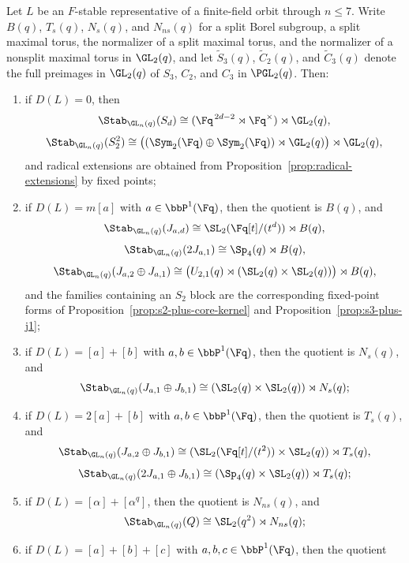\begin{theorem}
\label{thm:finite-field-stabilizers}
Let \(L\) be an \(F\)-stable representative of a finite-field orbit through
\(n\leq 7\). Write \(B(q)\), \(T_s(q)\), \(N_s(q)\), and \(N_{ns}(q)\) for a
split Borel subgroup, a split maximal torus, the normalizer of a split maximal
torus, and the normalizer of a nonsplit maximal torus in \(\GL_2(q)\), and let
\(\widetilde{S}_3(q)\), \(\widetilde{C}_2(q)\), and \(\widetilde{C}_3(q)\)
denote the full preimages in \(\GL_2(q)\) of \(S_3\), \(C_2\), and \(C_3\) in
\(\PGL_2(q)\). Then:
\begin{enumerate}[label=\arabic*.]
\item if \(D(L)=0\), then
  \[
    \Stab_{\GL_n(q)}(S_d)
    \cong
    (\Fq^{\,2d-2}\rtimes \Fq^\times)\rtimes \GL_2(q),
  \]
  \[
    \Stab_{\GL_n(q)}(S_2^2)
    \cong
    \bigl((\Sym_2(\Fq)\oplus \Sym_2(\Fq))\rtimes \GL_2(q)\bigr)\rtimes \GL_2(q),
  \]
  and radical extensions are obtained from
  Proposition~\ref{prop:radical-extensions} by fixed points;
\item if \(D(L)=m[a]\) with \(a\in \bbP^1(\Fq)\), then the quotient is
  \(B(q)\), and
  \[
    \Stab_{\GL_n(q)}(J_{a,d})
    \cong
    \SL_2(\Fq[t]/(t^d))\rtimes B(q),
  \]
  \[
    \Stab_{\GL_n(q)}(2J_{a,1})
    \cong
    \Sp_4(q)\rtimes B(q),
  \]
  \[
    \Stab_{\GL_n(q)}(J_{a,2}\oplus J_{a,1})
    \cong
    \bigl(U_{2,1}(q)\rtimes (\SL_2(q)\times \SL_2(q))\bigr)\rtimes B(q),
  \]
  and the families containing an \(S_2\) block are the corresponding
  fixed-point forms of Proposition~\ref{prop:s2-plus-core-kernel} and
  Proposition~\ref{prop:s3-plus-j1};
\item if \(D(L)=[a]+[b]\) with \(a,b\in \bbP^1(\Fq)\), then the quotient is
  \(N_s(q)\), and
  \[
    \Stab_{\GL_n(q)}(J_{a,1}\oplus J_{b,1})
    \cong
    (\SL_2(q)\times \SL_2(q))\rtimes N_s(q);
  \]
\item if \(D(L)=2[a]+[b]\) with \(a,b\in \bbP^1(\Fq)\), then the quotient is
  \(T_s(q)\), and
  \[
    \Stab_{\GL_n(q)}(J_{a,2}\oplus J_{b,1})
    \cong
    (\SL_2(\Fq[t]/(t^2))\times \SL_2(q))\rtimes T_s(q),
  \]
  \[
    \Stab_{\GL_n(q)}(2J_{a,1}\oplus J_{b,1})
    \cong
    (\Sp_4(q)\times \SL_2(q))\rtimes T_s(q);
  \]
\item if \(D(L)=[\alpha]+[\alpha^q]\), then the quotient is \(N_{ns}(q)\), and
  \[
    \Stab_{\GL_n(q)}(Q)\cong \SL_2(q^2)\rtimes N_{ns}(q);
  \]
\item if \(D(L)=[a]+[b]+[c]\) with \(a,b,c\in \bbP^1(\Fq)\), then the quotient

\end{enumerate}
\end{theorem}

